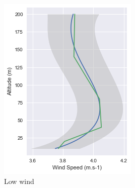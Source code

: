\documentclass[a4paper,11pt]{kth-mag}
\begin{document}
\begin{figure}
    \centering
    \begin{subfigure}[t]{0.32\textwidth}
        \centering
        \includegraphics[width=\textwidth]{images/gp_profile_good}
        \caption{Low wind}
        \label{fig:gp_profile_good}
    \end{subfigure}
    \hfill
    \begin{subfigure}[t]{0.32\textwidth}
        \centering

\end{subfigure}
\end{figure}
\end{document}
